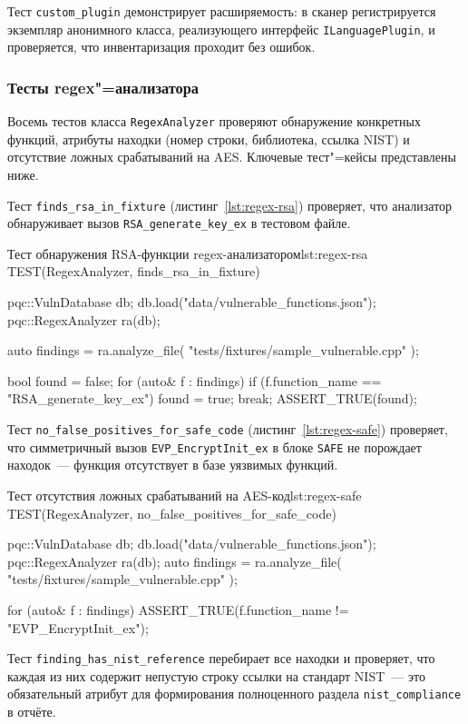 Тест \texttt{custom\_plugin} демонстрирует расширяемость: в сканер
регистрируется экземпляр анонимного класса, реализующего интерфейс
\texttt{ILanguagePlugin}, и проверяется, что инвентаризация проходит
без ошибок.

\subsubsection{Тесты regex"=анализатора}

Восемь тестов класса \texttt{RegexAnalyzer} проверяют обнаружение
конкретных функций, атрибуты находки (номер строки, библиотека, ссылка
NIST) и отсутствие ложных срабатываний на AES.
Ключевые тест"=кейсы представлены ниже.

Тест \texttt{finds\_rsa\_in\_fixture} (листинг~\ref{lst:regex-rsa})
проверяет, что анализатор обнаруживает вызов \texttt{RSA\_generate\_key\_ex}
в тестовом файле.

\begin{itmolisting}[C++]{Тест обнаружения RSA-функции regex-анализатором}{lst:regex-rsa}
TEST(RegexAnalyzer, finds_rsa_in_fixture) {
    pqc::VulnDatabase db;
    db.load("data/vulnerable_functions.json");
    pqc::RegexAnalyzer ra(db);

    auto findings = ra.analyze_file(
        "tests/fixtures/sample_vulnerable.cpp"
    );

    bool found = false;
    for (auto& f : findings)
        if (f.function_name == "RSA_generate_key_ex")
            { found = true; break; }
    ASSERT_TRUE(found);
}
\end{itmolisting}

Тест \texttt{no\_false\_positives\_for\_safe\_code}
(листинг~\ref{lst:regex-safe}) проверяет, что симметричный вызов
\texttt{EVP\_EncryptInit\_ex} в блоке \texttt{SAFE} не порождает
находок~--- функция отсутствует в базе уязвимых функций.

\begin{itmolisting}[C++]{Тест отсутствия ложных срабатываний на AES-код}{lst:regex-safe}
TEST(RegexAnalyzer, no_false_positives_for_safe_code) {
    pqc::VulnDatabase db;
    db.load("data/vulnerable_functions.json");
    pqc::RegexAnalyzer ra(db);
    auto findings = ra.analyze_file(
        "tests/fixtures/sample_vulnerable.cpp"
    );

    for (auto& f : findings)
        ASSERT_TRUE(f.function_name != "EVP_EncryptInit_ex");
}
\end{itmolisting}

Тест \texttt{finding\_has\_nist\_reference} перебирает все находки и
проверяет, что каждая из них содержит непустую строку ссылки на стандарт
NIST~--- это обязательный атрибут для формирования полноценного
раздела \texttt{nist\_compliance} в отчёте.

